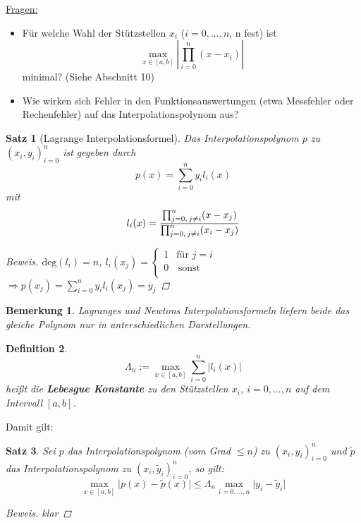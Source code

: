 \documentclass[12pt]{article}
\theoremstyle{break}
\newtheorem{theorem}{Satz}[subsection]
\newtheorem{definition}[theorem]{Definition}
\newtheorem*{comment*}{Bemerkung}
\begin{document}
\underline{Fragen:}
\begin{itemize}
  \item Für welche Wahl der Stützstellen $x_i$ ($i=0,...,n$, n fest) ist 
    $$\max_{x\in[a,b]} \left\vert \prod_{i=0}^n(x-x_i)\right\vert$$
    minimal? (Siehe Abschnitt 10)
  \item Wie wirken sich Fehler in den Funktionsauswertungen (etwa Messfehler oder Rechenfehler) auf das Interpolationspolynom aus?
\end{itemize}

\begin{theorem}[Lagrange Interpolationsformel]
Das Interpolationspolynom $p$ zu $(x_i, y_i)_{i=0}^n$ ist gegeben durch 
$$p(x) = \sum_{i=0}^n y_il_i(x)$$
mit 
$$l_i(x) = \frac{\prod_{j=0,\thinspace j\neq i}^n (x-x_j) }{\prod_{j=0,\thinspace j\neq i}^n ( x_i-x_j)}$$
\begin{proof}[Beweis]
$\text{deg}(l_i) = n$, $l_i(x_j) = \left\{
\begin{array}{ll}
1 & \textrm{für } j=i \\
0 & \, \textrm{sonst} \\
\end{array}
\right.$ \\
$\Rightarrow p(x_j) = \sum_{i=0}^n y_il_i(x_j) = y_j$
\end{proof}
\end{theorem}

\begin{comment*}
Lagranges und Newtons Interpolationsformeln liefern beide das gleiche Polynom nur in unterschiedlichen Darstellungen.
\end{comment*}

\begin{definition}
$$\Lambda_n := \max_{x\in[a,b]} \sum_{i=0}^n\vert l_i(x) \vert$$
heißt die \textbf{Lebesgue Konstante} zu den Stützstellen $x_i$, $i=0,...,n$ auf dem Intervall $[a,b]$.
\end{definition}

Damit gilt:

\begin{theorem}
Sei $p$ das Interpolationspolynom (vom Grad $\leq n$) zu $(x_i, y_i)_{i=0}^n$ und $\tilde{p}$ das Interpolationspolynom zu $(x_i, \tilde{y}_i)_{i=0}^n$, so gilt:
$$ \max_{x \in [a,b]} \vert p(x) - \tilde{p}(x) \vert \leq \Lambda_n \max_{i=0,...,n}\vert y_i - \tilde{y}_i \vert $$
\begin{proof}[Beweis]
klar
\end{proof}
\end{theorem}
\end{document}
